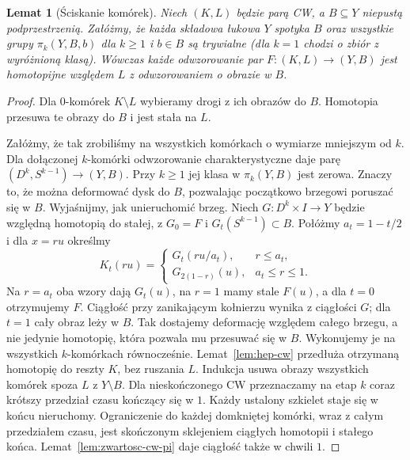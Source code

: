 \documentclass[11pt,a4paper,oneside]{report}
\theoremstyle{plain}
\newtheorem{lemat}[twierdzenie]{Lemat}
\theoremstyle{definition}
\theoremstyle{remark}
\begin{document}
\begin{lemat}[Ściskanie komórek]
\label{lem:kompresja-cw}
Niech $(K,L)$ będzie parą CW,
a $B\subseteq Y$ niepustą
podprzestrzenią. Załóżmy, że
każda składowa łukowa $Y$ spotyka
$B$ oraz wszystkie grupy
$\pi_k(Y,B,b)$ dla
$k\geq1$ i $b\in B$
są trywialne (dla $k=1$ chodzi o zbiór z wyróżnioną klasą). Wówczas
każde odwzorowanie par
$F:(K,L)\to(Y,B)$
jest homotopijne
\emph{względem $L$}
z odwzorowaniem o obrazie w $B$.
\end{lemat}
\begin{proof}
Dla $0$-komórek $K\setminus L$
wybieramy drogi z ich obrazów
do $B$. Homotopia przesuwa
te obrazy do $B$ i jest
stała na $L$.

Załóżmy, że tak zrobiliśmy
na wszystkich komórkach
o wymiarze mniejszym od $k$.
Dla dołączonej $k$-komórki
odwzorowanie charakterystyczne
daje parę
$(D^k,S^{k-1})\to(Y,B)$.
Przy $k\geq1$ jej klasa
w $\pi_k(Y,B)$ jest zerowa.
Znaczy to, że można
deformować dysk do $B$,
pozwalając początkowo
brzegowi poruszać się w $B$.
Wyjaśnijmy, jak unieruchomić brzeg. Niech
$G:D^k\times I\to Y$ będzie względną homotopią do stałej,
z $G_0=F$ i $G_t(S^{k-1})\subset B$.
Połóżmy $a_t=1-t/2$ i dla $x=ru$ określmy
\[
 K_t(ru)=
 \begin{cases}
 G_t(ru/a_t),&r\leq a_t,\\
 G_{2(1-r)}(u),&a_t\leq r\leq1.
 \end{cases}
\]
Na $r=a_t$ oba wzory dają $G_t(u)$, na $r=1$ mamy stale $F(u)$,
a dla $t=0$ otrzymujemy $F$. Ciągłość przy zanikającym kołnierzu
wynika z ciągłości $G$; dla $t=1$ cały obraz leży w $B$.
Tak dostajemy deformację względem całego brzegu, a nie jedynie
homotopię, która pozwala mu przesuwać się w $B$.
Wykonujemy je na
wszystkich $k$-komórkach
równocześnie.
Lemat~\ref{lem:hep-cw}
przedłuża otrzymaną
homotopię do reszty
$K$, bez ruszania $L$.
Indukcja usuwa obrazy
wszystkich komórek
spoza $L$ z $Y\setminus B$.
Dla nieskończonego CW
przeznaczamy na etap $k$
coraz krótszy przedział
czasu kończący się w $1$.
Każdy ustalony szkielet staje się w końcu nieruchomy.
Ograniczenie do każdej domkniętej komórki, wraz z całym przedziałem czasu,
jest skończonym sklejeniem ciągłych homotopii i stałego końca.
Lemat~\ref{lem:zwartosc-cw-pi} daje ciągłość także w chwili $1$.
\end{proof}
\end{document}
